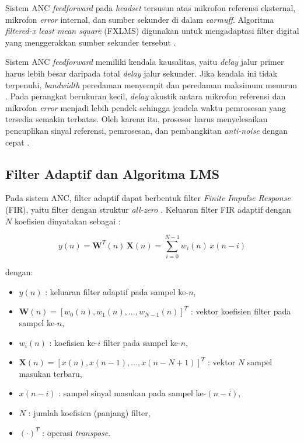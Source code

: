 Sistem ANC \emph{feedforward} pada \emph{headset} tersusun atas mikrofon referensi eksternal, mikrofon \emph{error} internal, dan sumber sekunder di dalam \emph{earmuff}. Algoritma \emph{filtered-x least mean square} (FXLMS) digunakan untuk mengadaptasi filter digital yang menggerakkan sumber sekunder tersebut \parencite{zhangqiu2014}.

Sistem ANC \emph{feedforward} memiliki kendala kausalitas, yaitu \emph{delay} jalur primer harus lebih besar daripada total \emph{delay} jalur sekunder. Jika kendala ini tidak terpenuhi, \emph{bandwidth} peredaman menyempit dan peredaman maksimum menurun \parencite{zhangqiu2014}. Pada perangkat berukuran kecil, \emph{delay} akustik antara mikrofon referensi dan mikrofon \emph{error} menjadi lebih pendek sehingga jendela waktu pemrosesan yang tersedia semakin terbatas. Oleh karena itu, prosesor harus menyelesaikan pencuplikan sinyal referensi, pemrosesan, dan pembangkitan \emph{anti-noise} dengan cepat \parencite{shi2023anc}.

\subsection{Filter Adaptif dan Algoritma LMS}
\label{sec:lms}

Pada sistem ANC, filter adaptif dapat berbentuk filter \emph{Finite Impulse Response} (FIR), yaitu filter dengan struktur \emph{all-zero} \parencite{chen2025}. Keluaran filter FIR adaptif dengan $N$ koefisien dinyatakan sebagai \parencite{zhangrs2023}:

\begin{equation}
  \label{eq:2_fir}
  y(n) = \mathbf{W}^T(n)\,\mathbf{X}(n) = \sum_{i=0}^{N-1} w_i(n)\,x(n-i)
\end{equation}

dengan:
\begin{itemize}[noitemsep, topsep=2pt]
  \item $y(n)$ : keluaran filter adaptif pada sampel ke-$n$,
  \item $\mathbf{W}(n) = [w_0(n), w_1(n), \ldots, w_{N-1}(n)]^T$ : vektor koefisien filter pada sampel ke-$n$,
  \item $w_i(n)$ : koefisien ke-$i$ filter pada sampel ke-$n$,
  \item $\mathbf{X}(n) = [x(n), x(n-1), \ldots, x(n-N+1)]^T$ : vektor $N$ sampel masukan terbaru,
  \item $x(n-i)$ : sampel sinyal masukan pada sampel ke-$(n-i)$,
  \item $N$ : jumlah koefisien (panjang) filter,
  \item $(\cdot)^T$ : operasi \emph{transpose}.
\end{itemize}

